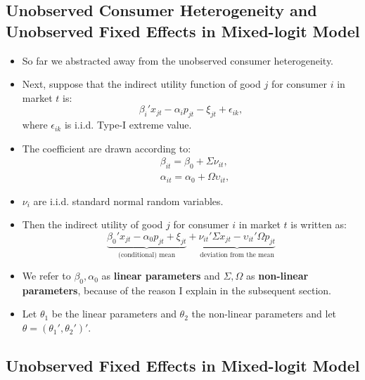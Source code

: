 \documentclass[
]{book}
\providecommand{\tightlist}{%
  \setlength{\itemsep}{0pt}\setlength{\parskip}{0pt}}
\begin{document}
\hypertarget{unobserved-consumer-heterogeneity-and-unobserved-fixed-effects-in-mixed-logit-model}{%
\subsection{Unobserved Consumer Heterogeneity and Unobserved Fixed Effects in Mixed-logit Model}\label{unobserved-consumer-heterogeneity-and-unobserved-fixed-effects-in-mixed-logit-model}}

\begin{itemize}
\tightlist
\item
  So far we abstracted away from the unobserved consumer heterogeneity.
\item
  Next, suppose that the indirect utility function of good \(j\) for consumer \(i\) in market \(t\) is:
  \begin{equation}
  \beta_i' x_{jt}  - \alpha_i p_{jt} - \xi_{jt} + \epsilon_{ik},
  \end{equation}
  where \(\epsilon_{ik}\) is i.i.d. Type-I extreme value.
\item
  The coefficient are drawn according to:
  \begin{equation}
  \begin{split}
  &\beta_{it} = \beta_0 + \Sigma \nu_{it},\\
  &\alpha_{it} = \alpha_0 + \Omega \upsilon_{it},
  \end{split}
  \end{equation}
\item
  \(\nu_i\) are i.i.d. standard normal random variables.
\item
  Then the indirect utility of good \(j\) for consumer \(i\) in market \(t\) is written as:
  \begin{equation}
  \underbrace{\beta_0' x_{jt} - \alpha_0 p_{jt} + \xi_{jt}}_{\text{(conditional) mean}} + \underbrace{\nu_{it}' \Sigma x_{jt} - \upsilon_{it}' \Omega p_{jt}}_{\text{deviation from the mean}} 
  \end{equation}
\item
  We refer to \(\beta_0, \alpha_0\) as \textbf{linear parameters} and \(\Sigma, \Omega\) as \textbf{non-linear parameters}, because of the reason I explain in the subsequent section.
\item
  Let \(\theta_1\) be the linear parameters and \(\theta_2\) the non-linear parameters and let \(\theta = (\theta_1', \theta_2')'\).
\end{itemize}

\hypertarget{unobserved-fixed-effects-in-mixed-logit-model}{%
\subsection{Unobserved Fixed Effects in Mixed-logit Model}\label{unobserved-fixed-effects-in-mixed-logit-model}}
\end{document}
